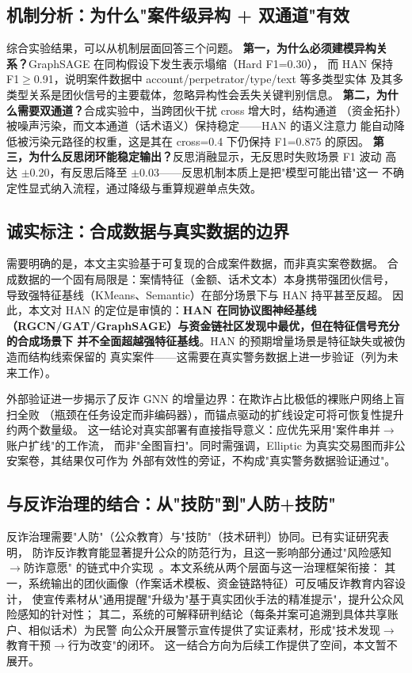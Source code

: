 \documentclass[12pt,a4paper]{ctexart}
\begin{document}
\subsection{机制分析：为什么"案件级异构 + 双通道"有效}

综合实验结果，可以从机制层面回答三个问题。
\textbf{第一，为什么必须建模异构关系？}GraphSAGE 在同构假设下发生表示塌缩（Hard F1=0.30），
而 HAN 保持 F1$\ge$0.91，说明案件数据中 account/perpetrator/type/text 等多类型实体
及其多类型关系是团伙信号的主要载体，忽略异构性会丢失关键判别信息。
\textbf{第二，为什么需要双通道？}合成实验中，当跨团伙干扰 cross 增大时，结构通道
（资金拓扑）被噪声污染，而文本通道（话术语义）保持稳定——HAN 的语义注意力
能自动降低被污染元路径的权重，这是其在 cross=0.4 下仍保持 F1=0.875 的原因。
\textbf{第三，为什么反思闭环能稳定输出？}反思消融显示，无反思时失败场景 F1 波动
高达 $\pm$0.20，有反思后降至 $\pm$0.03——反思机制本质上是把"模型可能出错"这一
不确定性显式纳入流程，通过降级与重算规避单点失效。

\subsection{诚实标注：合成数据与真实数据的边界}

需要明确的是，本文主实验基于可复现的合成案件数据，而非真实案卷数据。
合成数据的一个固有局限是：案情特征（金额、话术文本）本身携带强团伙信号，
导致强特征基线（KMeans、Semantic）在部分场景下与 HAN 持平甚至反超。
因此，本文对 HAN 的定位是审慎的：\textbf{HAN 在同协议图神经基线
（RGCN/GAT/GraphSAGE）与资金链社区发现中最优，但在特征信号充分的合成场景下
并不全面超越强特征基线}。HAN 的预期增量场景是特征缺失或被伪造而结构线索保留的
真实案件——这需要在真实警务数据上进一步验证（列为未来工作）。

外部验证进一步揭示了反诈 GNN 的增量边界：在欺诈占比极低的裸账户网络上盲扫全败
（瓶颈在任务设定而非编码器），而锚点驱动的扩线设定可将可恢复性提升约两个数量级。
这一结论对真实部署有直接指导意义：应优先采用"案件串并$\to$账户扩线"的工作流，
而非"全图盲扫"。同时需强调，Elliptic 为真实交易图而非公安案卷，其结果仅可作为
外部有效性的旁证，不构成"真实警务数据验证通过"。

\subsection{与反诈治理的结合：从"技防"到"人防+技防"}

反诈治理需要"人防"（公众教育）与"技防"（技术研判）协同。已有实证研究表明，
防诈反诈教育能显著提升公众的防范行为，且这一影响部分通过"风险感知$\to$防诈意愿"
的链式中介实现~\cite{jiang2025antifraud}。本文系统从两个层面与这一治理框架衔接：
其一，系统输出的团伙画像（作案话术模板、资金链路特征）可反哺反诈教育内容设计，
使宣传素材从"通用提醒"升级为"基于真实团伙手法的精准提示"，提升公众风险感知的针对性；
其二，系统的可解释研判结论（每条并案可追溯到具体共享账户、相似话术）为民警
向公众开展警示宣传提供了实证素材，形成"技术发现$\to$教育干预$\to$行为改变"的闭环。
这一结合方向为后续工作提供了空间，本文暂不展开。
\end{document}
